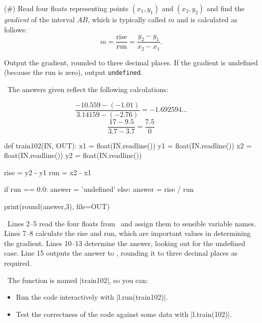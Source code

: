 
\clearpage


\Question (\#\theproblemnumber) Read four floats representing points $(x_1,y_1)$ and
$(x_2,y_2)$ and find the \emph{gradient} of the interval $AB$, which is typically called
$m$ and is calculated as follows:
\[ m = \frac{\mathrm{rise}}{\mathrm{run}} = \frac{y_2 - y_1}{x_2 - x_1}.\]

Output the gradient, rounded to three decimal places.  If the gradient is undefined
(because the run is zero), output \texttt{undefined}.

\Sample

               {}
               {}

\Explanation\ The answers given reflect the following calculations:

\vspace{-5mm}
\minipagesthree{\[\frac{3.5-1}{10-5} = 2.5\]}
               {\[\frac{-10.559 - (-1.01)}{3.14159 - (-2.76)} = -1.692594\ldots\]}
               {\[\frac{17 - 9.5}{3.7 - 3.7} = \frac{7.5}{0}\]}


\Solution

\begin{pythoncode} 
  def train102(IN, OUT):
    x1 = float(IN.readline())
    y1 = float(IN.readline())
    x2 = float(IN.readline())
    y2 = float(IN.readline())

    rise = y2 - y1
    run  = x2 - x1

    if run == 0.0:
      answer = 'undefined'
    else:
      answer = rise / run

    print(round(answer,3), file=OUT)
\end{pythoncode}

\Explanation\ Lines 2--5 read the four floats from \IN\ and assign them to sensible
variable names. Lines 7--8 calculate the rise and run, which are important values in
determining the gradient. Lines 10--13 determine the answer, looking out for the undefined
case. Line 15 outputs the answer to \OUT, rounding it to three decimal places as required.

\Running\ The function is named \pycode|train102|, so you can:
\begin{itemize}
  \item Run the code interactively with \pycode|l.run(train102)|.
  \item Test the correctness of the code against some data with \pycode|l.train(102)|.
\end{itemize}
